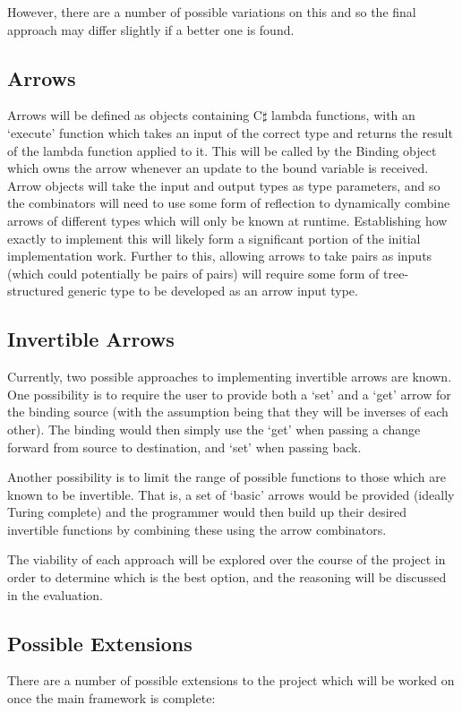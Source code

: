 \documentclass[12pt,a4]{article}
\begin{document}
		However, there are a number of possible variations on this and so the final approach may differ slightly if a better one is found.
	
	\subsection{Arrows}
		Arrows will be defined as objects containing C$\sharp$ lambda functions, with an `execute' function which takes an input of the correct type and returns the result of the lambda function applied to it. This will be called by the Binding object which owns the arrow whenever an update to the bound variable is received. Arrow objects will take the input and output types as type parameters, and so the combinators will need to use some form of reflection to dynamically combine arrows of different types which will only be known at runtime. Establishing how exactly to implement this will likely form a significant portion of the initial implementation work. Further to this, allowing arrows to take pairs as inputs (which could potentially be pairs of pairs) will require some form of tree-structured generic type to be developed as an arrow input type.
	
	\subsection{Invertible Arrows}
		Currently, two possible approaches to implementing invertible arrows are known. One possibility is to require the user to provide both a `set' and a `get' arrow for the binding source (with the assumption being that they will be inverses of each other). The binding would then simply use the `get' when passing a change forward from source to destination, and `set' when passing back.
		
		Another possibility is to limit the range of possible functions to those which are known to be invertible. That is, a set of `basic' arrows would be provided (ideally Turing complete) and the programmer would then build up their desired invertible functions by combining these using the arrow combinators.
		
		The viability of each approach will be explored over the course of the project in order to determine which is the best option, and the reasoning will be discussed in the evaluation.
	
	\subsection{Possible Extensions}
		There are a number of possible extensions to the project which will be worked on once the main framework is complete:
		
\end{document}
